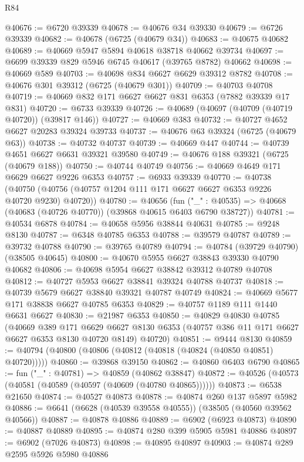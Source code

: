 \begin{lexlean}{R84}
\begin{coremodule}
@40676 := @6720 @39339
@40678 := @40676 @34 @39330
@40679 := @6726 @39339
@40682 := @40678 (@6725 (@40679 @34))
@40683 := @40675 @40682
@40689 := @40669 @5947 @5894 @40618 @38718 @40662 @39734
@40697 := @6699 @39339 @829 @5946 @6745 @40617 (@39765 @8782) @40662
@40698 := @40669 @589
@40703 := @40698 @834 @6627 @6629 @39312 @8782
@40708 := @40676 @301 @39312 (@6725 (@40679 @301))
@40709 := @40703 @40708
@40719 := @40669 @832 @171 @6627 @6627 @831 @6353 (@7882 @39339 @17 @831)
@40720 := @6733 @39339
@40726 := @40689 (@40697 (@40709 (@40719 @40720)) (@39817 @146))
@40727 := @40669 @383
@40732 := @40727 @4652 @6627 @20283 @39324 @39733
@40737 := @40676 @63 @39324 (@6725 (@40679 @63))
@40738 := @40732 @40737
@40739 := @40669 @447
@40744 := @40739 @4651 @6627 @6631 @39321 @39580
@40749 := @40676 @188 @39321 (@6725 (@40679 @188))
@40750 := @40744 @40749
@40756 := @40669 @4649 @171 @6629 @6627 @9226 @6353
@40757 := @6933 @39339
@40770 := @40738
    (@40750 (@40756 (@40757 @1204 @111 @171 @6627 @6627 @6353 @9226 @40720 @9230) @40720))
@40780 := @40656
    (fun ("_" : @40535) => @40668 (@40683 (@40726 @40770)) (@39868 @40615 @6403 @6790 @38727))
@40781 := @40534 @6878
@40784 := @40658 @5956 @38844 @40631
@40785 := @9248 @8130
@40787 := @6348 @40785 @6353
@40788 := @39579 @40787
@40789 := @39732 @40788
@40790 := @39765 @40789
@40794 := @40784 (@39729 @40790) (@38505 @40645)
@40800 := @40670 @5955 @6627 @38843 @39330 @40790 @40682
@40806 := @40698 @5954 @6627 @38842 @39312 @40789 @40708
@40812 := @40727 @5953 @6627 @38841 @39324 @40788 @40737
@40818 := @40739 @5679 @6627 @38840 @39321 @40787 @40749
@40824 := @40669 @5677 @171 @38838 @6627 @40785 @6353
@40829 := @40757 @1189 @111 @1440 @6631 @6627
@40830 := @21987 @6353
@40850 := @40829
    @40830
    @40785
    (@40669
      @389
      @171
      @6629
      @6627
      @8130
      @6353
      (@40757 @386 @11 @171 @6627 @6627 @6353 @8130 @40720 @8149)
      @40720)
@40851 := @9444 @8130
@40859 := @40794 (@40800 (@40806 (@40812 (@40818 (@40824 (@40850 @40851) @40720)))))
@40860 := @39868 @39150
@40862 := @40860 @6403 @6790
@40865 := fun ("_" : @40781) => @40859 (@40862 @38847)
@40872 := @40526 (@40573 (@40581 (@40589 (@40597 (@40609 (@40780 @40865))))))
@40873 := @6538 @21650
@40874 := @40527 @40873
@40878 := @40874 @260 @137 @5897 @5982
@40886 := @6641 (@6628 (@40539 @39558 @40555)) (@38505 (@40560 @39562 @40566))
@40887 := @40878 @40886
@40889 := @6902 (@6923 @40873)
@40890 := @40887 @40889
@40895 := @40874 @280 @399 @5905 @5981 @40886
@40897 := @6902 (@7026 @40873)
@40898 := @40895 @40897
@40903 := @40874 @289 @2595 @5926 @5980 @40886

\end{coremodule}
\end{lexlean}
